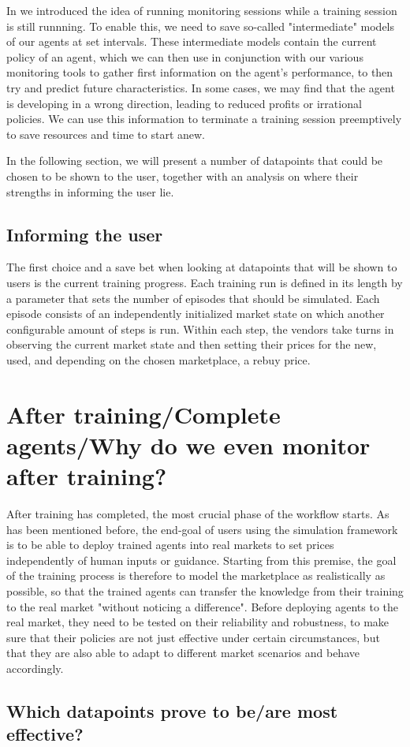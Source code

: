 In  we introduced the idea of running monitoring sessions while a training session is still runnning. To enable this, we need to save so-called "intermediate" models of our agents at set intervals. These intermediate models contain the current policy of an agent, which we can then use in conjunction with our various monitoring tools to gather first information on the agent's performance, to then try and predict future characteristics. In some cases, we may find that the agent is developing in a wrong direction, leading to reduced profits or irrational policies. We can use this information to terminate a training session preemptively to save resources and time to start anew. 

In the following section, we will present a number of datapoints that could be chosen to be shown to the user, together with an analysis on where their strengths in informing the user lie.

\subsection{Informing the user}

The first choice and a save bet when looking at datapoints that will be shown to users is the current training progress. Each training run is defined in its length by a parameter that sets the number of episodes that should be simulated. Each episode consists of an independently initialized market state on which another configurable amount of steps is run. Within each step, the vendors take turns in observing the current market state and then setting their prices for the new, used, and depending on the chosen marketplace, a rebuy price. 

\section{After training/Complete agents/Why do we even monitor after training?}

After training has completed, the most crucial phase of the workflow starts. As has been mentioned before, the end-goal of users using the simulation framework is to be able to deploy trained agents into real markets to set prices independently of human inputs or guidance. Starting from this premise, the goal of the training process is therefore to model the marketplace as realistically as possible, so that the trained agents can transfer the knowledge from their training to the real market "without noticing a difference". Before deploying agents to the real market, they need to be tested on their reliability and robustness, to make sure that their policies are not just effective under certain circumstances, but that they are also able to adapt to different market scenarios and behave accordingly.

\subsection{Which datapoints prove to be/are most effective?}
